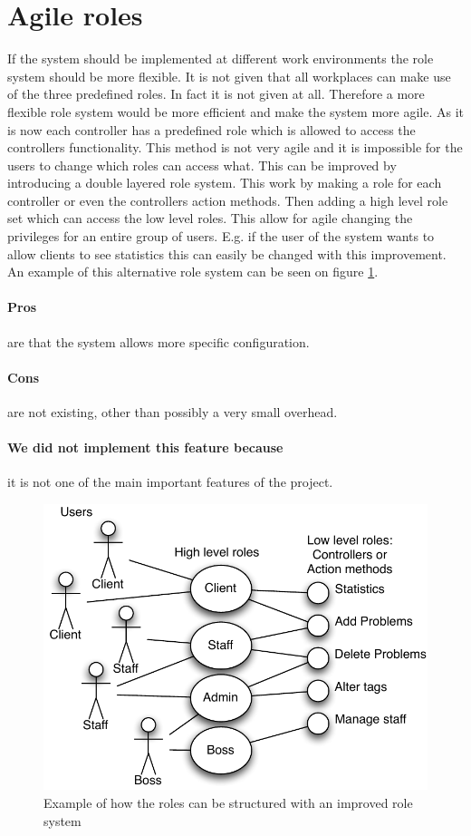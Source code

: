 \section{Agile roles}
\label{sec:agile_roles}
If the system should be implemented at different work environments the role system should be more flexible. 
It is not given that all workplaces can make use of the three predefined roles. 
In fact it is not given at all. 
Therefore a more flexible role system would be more efficient and make the system more agile. 
As it is now each controller has a predefined role which is allowed to access the controllers functionality. 
This method is not very agile and it is impossible for the users to change which roles can access what. 
This can be improved by introducing a double layered role system.  
This work by making a role for each controller or even the controllers action methods. 
Then adding a high level role set which can access the low level roles. 
This allow for agile changing the privileges for an entire group of users. 
E.g. if the user of the system wants to allow clients to see statistics this can easily be changed with this improvement. An example of this alternative role system can be seen on figure \ref{fig:improved_role_system}.

\paragraph{Pros} are that the system allows more specific configuration. 
\paragraph{Cons} are not existing, other than possibly a very small overhead.
\paragraph{We did not implement this feature because} it is not one of the main important features of the project.

\begin{figure}
\begin{center}
\includegraphics[scale=1]{input/epilogue/improvements/improved_role_system.pdf}
\caption{Example of how the roles can be structured with an improved role system}
\label{fig:improved_role_system}
\end{center}
\end{figure}
